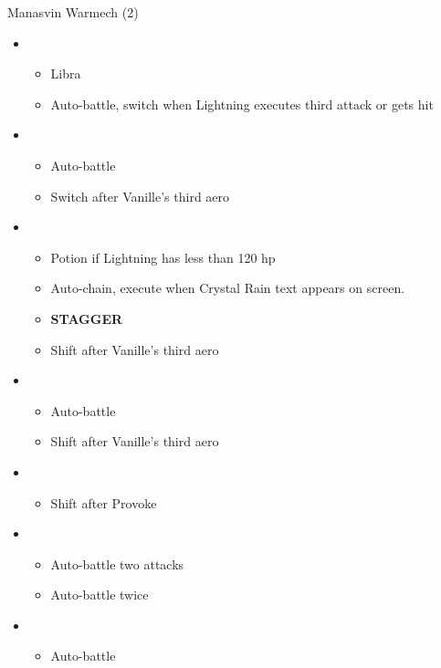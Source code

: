 \begin{multicols}{2}
\begin{battle}{Manasvin Warmech (2)}
\begin{itemize}
    \item \third
    \begin{itemize}
        \item Libra
        \item Auto-battle, switch when Lightning executes third attack or gets hit
    \end{itemize}
    \item \fourth
    \begin{itemize}
        \item Auto-battle
        \item Switch after Vanille's third aero
    \end{itemize}
    \item \first
    \begin{itemize}
        \item Potion if Lightning has less than 120 hp
        \item Auto-chain, execute when Crystal Rain text appears on screen.
        \item \textbf{STAGGER}
        \item Shift after Vanille's third aero
    \end{itemize}
    \item \third
    \begin{itemize}
        \item Auto-battle
        \item Shift after Vanille's third aero
    \end{itemize}
    \item \second
    \begin{itemize}
        \item Shift after Provoke
    \end{itemize}
    \item \third
    \begin{itemize}
        \item Auto-battle two attacks
        \item Auto-battle twice
    \end{itemize}
    \item \fourth
    \begin{itemize}
        \item Auto-battle
    \end{itemize}
\end{itemize}
\end{battle}


\end{multicols}
